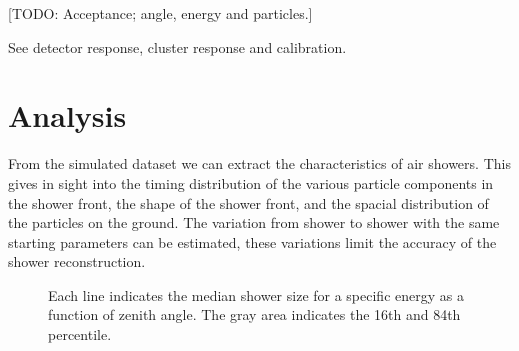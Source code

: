 [TODO: Acceptance; angle, energy and particles.]

See detector response, cluster response and calibration.


\section{Analysis}

From the simulated dataset we can extract the characteristics of air showers. This gives in sight into the timing distribution of the various particle components in the shower front, the shape of the shower front, and the spacial distribution of the particles on the ground. The variation from shower to shower with the same starting parameters can be estimated, these variations limit the accuracy of the shower reconstruction.


\begin{figure}
    \centering
    
    \caption{             Each line indicates the median shower size for a specific energy as a function of zenith angle. The gray area indicates the 16th and 84th percentile.}
    \label{fig:simulations_shower_sizes}
\end{figure}
